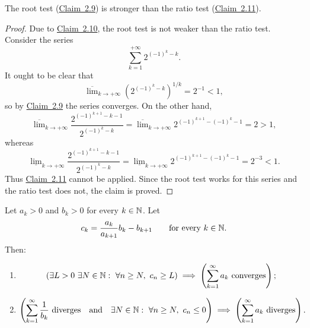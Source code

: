 \begin{claim}\label{claim:2.12}
The root test (\hyperref[claim:2.9]{Claim~2.9}) is stronger than the ratio test (\hyperref[claim:2.11]{Claim~2.11}).
\end{claim}

\begin{proof}
Due to \hyperref[claim:2.10]{Claim~2.10}, the root test is not weaker than the ratio test. Consider the series
\[
\sum_{k=1}^{+\infty}2^{(-1)^k-k}.
\]
It ought to be clear that
\[
\overline{\lim}_{k\to+\infty}
\left(2^{(-1)^k-k}\right)^{1/k}
=2^{-1}<1,
\]
so by \hyperref[claim:2.9]{Claim~2.9} the series converges. On the other hand,
\[
\overline{\lim}_{k\to+\infty}
\frac{2^{(-1)^{k+1}-k-1}}{2^{(-1)^k-k}}
=
\overline{\lim}_{k\to+\infty}
2^{(-1)^{k+1}-(-1)^k-1}
=2>1,
\]
whereas
\[
\underline{\lim}_{k\to+\infty}
\frac{2^{(-1)^{k+1}-k-1}}{2^{(-1)^k-k}}
=
\underline{\lim}_{k\to+\infty}
2^{(-1)^{k+1}-(-1)^k-1}
=2^{-3}<1.
\]
Thus \hyperref[claim:2.11]{Claim~2.11} cannot be applied. Since the root test works for this series and the ratio test does not, the claim is proved.
\end{proof}

\begin{claim}\label{claim:2.13}
Let $a_k>0$ and $b_k>0$ for every $k\in\mathbb{N}$. Let
\[
c_k=\frac{a_k}{a_{k+1}}b_k-b_{k+1}
\qquad\text{for every }k\in\mathbb{N}.
\]
Then:
\begin{enumerate}[label=\arabic*)]
\item\label{item:claim:2.13:1}
\[
\left(\exists L>0\ \exists N\in\N:\ \forall n\ge N,\ c_n\ge L\right)
\implies
\left(\sum_{k=1}^{\infty}a_k\text{ converges}\right);
\]
\item\label{item:claim:2.13:2}
\[
\left(
\sum_{k=1}^{\infty}\frac1{b_k}\text{ diverges}
\quad\text{and}\quad
\exists N\in\mathbb{N}:\ \forall n\ge N,\ c_n\le0
\right)
\implies
\left(\sum_{k=1}^{\infty}a_k\text{ diverges}\right).
\]
\end{enumerate}
\end{claim}

